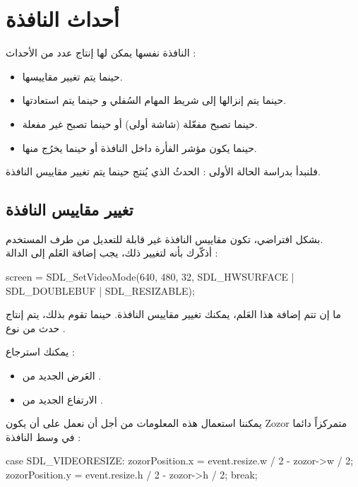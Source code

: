 \section{أحداث النافذة}

النافذة نفسها يمكن لها إنتاج عدد من الأحداث :

\begin{itemize}
	\item حينما يتم تغيير مقاييسها.
	\item حينما يتم إنزالها إلى شريط المهام السُفلي و حينما يتم استعادتها.
	\item حينما تصبح مفعّلة (شاشة أولى) أو حينما تصبح غير مفعلة.
	\item حينما يكون مؤشر الفأرة داخل النافذة أو حينما يخرُج منها.
\end{itemize}

فلنبدأ بدراسة الحالة الأولى : الحدثُ الذي يُنتج حينما يتم تغيير مقاييس النافذة.

\subsection{تغيير مقاييس النافذة}

بشكل افتراضي، تكون مقاييس النافذة غير قابلة للتعديل من طرف المستخدم.\\
أذكّرك بأنه لتغيير ذلك، يجب إضافة العَلم
إلى الدالة
 :

\begin{Csource}
screen = SDL_SetVideoMode(640, 480, 32, SDL_HWSURFACE | SDL_DOUBLEBUF | SDL_RESIZABLE);
\end{Csource}

ما إن تتم إضافة هذا العَلم، يمكنك تغيير مقاييس النافذة. حينما تقوم بذلك، يتم إنتاج  حدث من نوع
.

يمكنك استرجاع :

\begin{itemize}
	\item العَرض الجديد من
	.
	\item الارتفاع الجديد من
	.
\end{itemize}

يمكننا استعمال هذه المعلومات من أجل أن نعمل على أن يكون
\textenglish{Zozor}
متمركزاً دائما في وسط النافذة :

\begin{Csource}
case SDL_VIDEORESIZE:
zozorPosition.x = event.resize.w / 2 - zozor->w / 2;
zozorPosition.y = event.resize.h / 2 - zozor->h / 2;
break;
\end{Csource}

